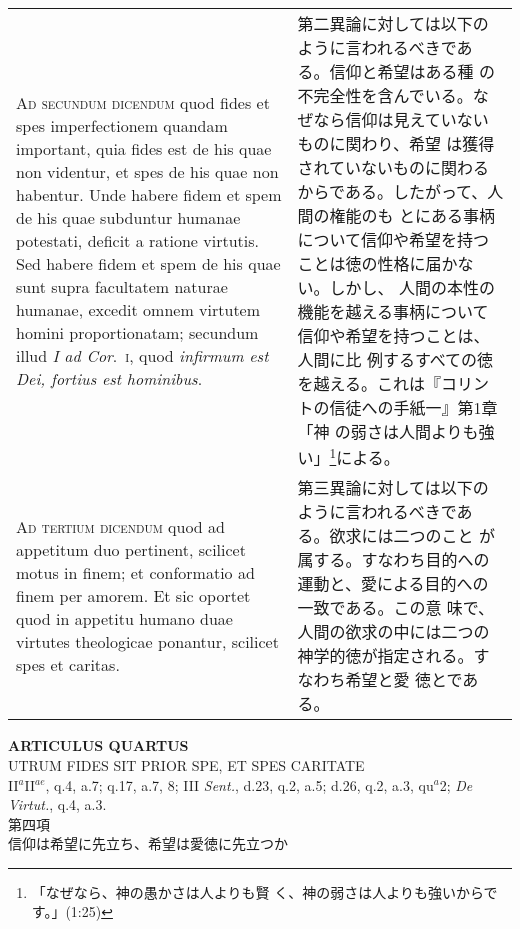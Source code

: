 \documentclass[10pt]{jsarticle}
\begin{document}
\begin{longtable}{p{21em}p{21em}}
\\

{\scshape Ad secundum dicendum} quod fides et spes imperfectionem
quandam important, quia fides est de his quae non videntur, et spes de
his quae non habentur. Unde habere fidem et spem de his quae subduntur
humanae potestati, deficit a ratione virtutis. Sed habere fidem et
spem de his quae sunt supra facultatem naturae humanae, excedit omnem
virtutem homini proportionatam; secundum illud {\itshape I ad
Cor}.~{\scshape i}, quod {\itshape infirmum est Dei, fortius est
hominibus}.

&

 第二異論に対しては以下のように言われるべきである。信仰と希望はある種
 の不完全性を含んでいる。なぜなら信仰は見えていないものに関わり、希望
 は獲得されていないものに関わるからである。したがって、人間の権能のも
 とにある事柄について信仰や希望を持つことは徳の性格に届かない。しかし、
 人間の本性の機能を越える事柄について信仰や希望を持つことは、人間に比
 例するすべての徳を越える。これは『コリントの信徒への手紙一』第1章「神
 の弱さは人間よりも強い」\footnote{「なぜなら、神の愚かさは人よりも賢
 く、神の弱さは人よりも強いからです。」(1:25)}による。
 
\\



{\scshape Ad tertium dicendum} quod ad appetitum duo pertinent,
scilicet motus in finem; et conformatio ad finem per amorem. Et sic
oportet quod in appetitu humano duae virtutes theologicae ponantur,
scilicet spes et caritas.

&

 第三異論に対しては以下のように言われるべきである。欲求には二つのこと
 が属する。すなわち目的への運動と、愛による目的への一致である。この意
 味で、人間の欲求の中には二つの神学的徳が指定される。すなわち希望と愛
 徳とである。
 
\\


\end{longtable}
\newpage

\begin{center}
{\Large {\bf ARTICULUS QUARTUS}}\\
{\large UTRUM FIDES SIT PRIOR SPE, ET SPES CARITATE}\\
{\footnotesize II$^{a}$II$^{ae}$, q.4, a.7; q.17, a.7, 8; III {\itshape Sent.}, d.23, q.2, a.5; d.26, q.2, a.3, qu$^{a}$2; {\itshape De Virtut.}, q.4, a.3.}\\
{\Large 第四項\\信仰は希望に先立ち、希望は愛徳に先立つか}
\end{center}
\end{document}
